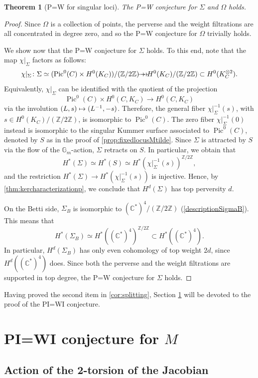 \documentclass[JEP,XML,SOM,Unicode, NoEqCountersInSection,NoFloatCountersInSection,published]{cedram}
\newcommand\mto{\mathchoice{\longmapsto}{\mapsto}{\mapsto}{\mapsto}}
\newcommand{\onto}{\mathchoice{\to\hspace*{-5mm}\to}{\to\hspace*{-2.85mm}\to}{\to\hspace*{-3mm}\to}{\to\hspace*{-3mm}\to}}
\newtheorem{thm}{Theorem}[section]
\theoremstyle{definition}
\newcommand{\Gm}{\mathbb{G}_m}
\newcommand{\CC}{\mathbb{C}}
\newcommand{\ZZ}{\mathbb{Z}}
\newcommand{\Pic}{\operatorname{Pic}}
\begin{document}
\begin{thm}[P=W for singular loci] \label{P=Wforsingularloci}
The P=W conjecture for $\Sigma$ and $\Omega$ holds.
\end{thm}
\begin{proof}
Since $\Omega$ is a collection of points, the perverse and the weight filtrations are all concentrated in degree zero, and so the P=W conjecture for $\Omega$ trivially holds.

We show now that the P=W conjecture for $\Sigma$ holds. To this end, note that the map $\chi|_{\Sigma}$ factors as follows:
\[
\chi|_{\Sigma}\colon \Sigma \simeq (\Pic^0(C) \times H^0(K_C))/(\ZZ/2\ZZ) \onto H^0(K_C)/(\ZZ/2\ZZ) \subset H^0(K_C^{\otimes 2}).
\]
Equivalently, $\chi|_{\Sigma}$ can be identified with the quotient of the projection
\[
\Pic^0(C) \times H^0(C, K_C) \to H^0(C, K_C)
\]
via the involution $(L, s) \mto (L^{-1}, -s)$. Therefore, the general fiber $\chi|_{\Sigma}^{-1}(s)$, with $s \in H^0(K_C)/(\ZZ/2\ZZ)$, is isomorphic to $\Pic^0(C)$. The zero fiber $\chi|_{\Sigma}^{-1}(0)$ instead is isomorphic to the singular Kummer surface associated to $\Pic^0(C)$, denoted by $S$ as in the proof of \cref{prop:fixedlocusMtilde}. Since $\Sigma$ is attracted by $S$ via the flow of the $\Gm$\nobreakdash-action, $\Sigma$ retracts on $S$. In particular, we obtain that
\[
H^*(\Sigma)\simeq H^*(S) \simeq H^*(\chi|_{\Sigma}^{-1}(s))^{\ZZ/2\ZZ},
\]
and the restriction $H^*(\Sigma) \to H^*(\chi|_{\Sigma}^{-1}(s))$ is injective. Hence, by \cref{thm:kercharacterizationp}, we conclude that $H^d(\Sigma)$ has top perversity $d$.

On the Betti side, $\Sigma_B$ is isomorphic to $(\CC^*)^{4}/(\ZZ/2\ZZ)$ (\cf \eqref{descriptionSigmaB}). This means that
\[
H^*(\Sigma_B) \simeq H^*((\CC^*)^{4})^{\ZZ/2\ZZ} \subset H^*((\CC^*)^{4}).
\]
In particular, $H^{d}(\Sigma_B)$ has only even cohomology of top weight $2d$, since $H^d((\CC^*)^{4})$ does. Since both the perverse and the weight filtrations are supported in top degree, the P=W conjecture for $\Sigma$ holds.
\end{proof}

Having proved the second item in \cref{cor:splitting},
Section \ref{sec:PI=WI} will be devoted to the proof of the PI=WI conjecture.

\section{PI=WI conjecture for \texorpdfstring{$M$}{M}}\label{sec:PI=WI}
\subsection{Action of the 2-torsion of the Jacobian}\label{sec:The action of the 2-torsion of the Jacobian}
\end{document}
